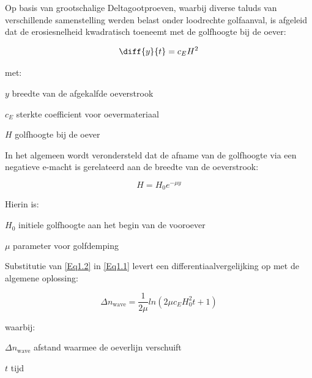 Op basis van grootschalige Deltagootproeven, waarbij diverse taluds van verschillende samenstelling werden belast onder loodrechte golfaanval, is afgeleid dat de erosiesnelheid kwadratisch toeneemt met de golfhoogte bij de oever:

\begin{equation}
\diff{y}{t} = c_E H^2
\label{Eq1.1}
\end{equation}

met:

\begin{symbollist}
\item[$y$] breedte van de afgekalfde oeverstrook 
\item[$c_E$] sterkte coefficient voor oevermateriaal 
\item[$H$] golfhoogte bij de oever 
\end{symbollist}

In het algemeen wordt verondersteld dat de afname van de golfhoogte via een negatieve e-macht is gerelateerd aan de breedte van de oeverstrook:

\begin{equation}
H = H_0 e^{-\mu y}
\label{Eq1.2}
\end{equation}

Hierin is:

\begin{symbollist}
\item[$H_0$] initiele golfhoogte aan het begin van de vooroever 
\item[$\mu$] parameter voor golfdemping 
\end{symbollist}

Substitutie van \autoref{Eq1.2} in \autoref{Eq1.1} levert een differentiaalvergelijking op met de algemene oplossing:

\begin{equation}
\Delta n_\text{wave} = \frac{1}{2 \mu} ln ( 2 \mu c_E H_0^2 t + 1 )
\end{equation}

waarbij:

\begin{symbollist}
\item[$\Delta n_\text{wave}$] afstand waarmee de oeverlijn verschuift 
\item[$t$] tijd 
\end{symbollist}

